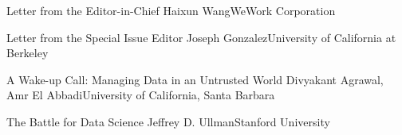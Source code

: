 \documentclass[11pt]{article}
\begin{document}


\begin{bulletin}


%
%

\begin{lettersection}


\begin{letter}{Letter from the Editor-in-Chief}
{Haixun Wang}{WeWork Corporation}

\end{letter}
%
\newpage
%
%
\begin{letter}{Letter from the Special Issue Editor}
{Joseph Gonzalez}{University of California at Berkeley}


\end{letter}

\end{lettersection}


\begin{opinionsection}
\begin{opinion}{A Wake-up Call: Managing Data in an Untrusted World}
{Divyakant Agrawal, Amr El Abbadi}{University of California, Santa Barbara}

\end{opinion}
\begin{opinion}{The Battle for Data Science}
{Jeffrey D. Ullman}{Stanford University}

\end{opinion}
\end{opinionsection}


\end{bulletin}
\end{document}
